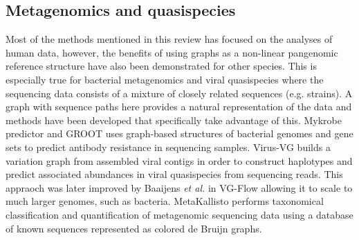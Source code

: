 \subsection{Metagenomics and quasispecies}
Most of the methods mentioned in this review has focused on the analyses of human data, however, the benefits of using graphs as a non-linear pangenomic reference structure have also been demonstrated for other species.
This is especially true for bacterial metagenomics and viral quasispecies where the sequencing data consists of a mixture of closely related sequences (e.g. strains).
A graph with sequence paths here provides a natural representation of the data and methods have been developed that specifically take advantage of this. 
Mykrobe predictor \cite{Bradley2015-kl} and GROOT \cite{Rowe2018-bg} uses graph-based structures of bacterial genomes and gene sets to predict antibody resistance in sequencing samples.
Virus-VG \cite{Baaijens2019-ng} builds a variation graph from assembled viral contigs in order to construct haplotypes and predict associated abundances in viral quasispecies from sequencing reads.
This appraoch was later improved by Baaijens \textit{et al.} in VG-Flow \cite{Baaijens2019-ha} allowing it to scale to much larger genomes, such as bacteria.  
MetaKallisto \cite{Schaeffer2017-fh} performs taxonomical classification and quantification of metagenomic sequencing data using a database of known sequences represented as colored de Bruijn graphs.

